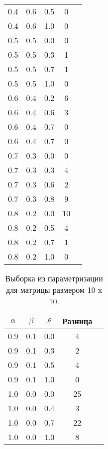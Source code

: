 \begin{table}[h!]
\begin{tabular}{|c|c|c|c|c|}
            0.4  & 0.6  & 0.5  & 0     \\
            0.4  & 0.6  & 1.0  & 0     \\
            \hline
            0.5  & 0.5  & 0.0  & 0     \\
            0.5  & 0.5  & 0.3  & 1     \\
            0.5  & 0.5  & 0.7  & 1     \\
            0.5  & 0.5  & 1.0  & 0     \\
            \hline
            0.6  & 0.4  & 0.2  & 6     \\
            0.6  & 0.4  & 0.6  & 3     \\
            0.6  & 0.4  & 0.7  & 0     \\
            0.6  & 0.4  & 0.7  & 0     \\
            \hline
            0.7  & 0.3  & 0.0  & 0     \\
            0.7  & 0.3  & 0.3  & 4     \\
            0.7  & 0.3  & 0.6  & 2     \\
            0.7  & 0.3  & 0.8  & 9     \\
            \hline
            0.8  & 0.2  & 0.0  & 10    \\
            0.8  & 0.2  & 0.5  & 4     \\
            0.8  & 0.2  & 0.7  & 1     \\
            0.8  & 0.2  & 1.0  & 0     \\
            \hline
        \end{tabular}
    \end{table}

    \begin{table}[h!]
        \caption{Выборка из параметризации для матрицы размером 10 x 10.}
        \label{table:test:params}
        \centering
        \begin{tabular}{|c|c|c|c|c|}
            \hline
            $\alpha$        & $\beta$      & $\rho$  & Разница \\
            \hline
            0.9  & 0.1  & 0.0 & 4     \\
            0.9  & 0.1  & 0.3 & 2     \\
            0.9  & 0.1  & 0.5 & 4     \\
            0.9  & 0.1  & 1.0 & 0     \\
            \hline
            1.0  & 0.0  & 0.0 & 25     \\
            1.0  & 0.0  & 0.4 & 3      \\
            1.0  & 0.0  & 0.7 & 22     \\
            1.0  & 0.0  & 1.0 & 8      \\
            \hline
        \end{tabular}
    \end{table}

